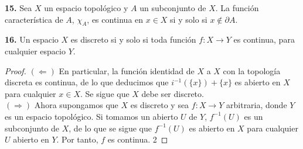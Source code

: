 \documentclass{article}
\begin{document}
\begin{mybox}
	\textbf{15. } Sea $X$ un espacio topológico y $A$ un subconjunto de $X$. La función característica de $A$, $\chi_{A}$, es continua en $x \in X$ si y solo si $x \notin \partial A$. 
\end{mybox}

\begin{mybox}
	\textbf{16. } Un espacio $X$ es discreto si y solo si toda función $f:X \rightarrow Y$ es continua, para cualquier espacio $Y$.
\end{mybox}	

\begin{proof}
	$(\Leftarrow)$ En particular, la función identidad de $X$ a $X$ con la topología discreta es continua, de lo que deducimos que $i^{-1}(\{x \}) + \{x \}$ es abierto en $X$ para cualquier $x \in X$. Se sigue que $X$ debe ser discreto. \\
	$(\Rightarrow)$ Ahora supongamos que $X$ es discreto y sea $f:X \rightarrow Y$ arbitraria, donde $Y$ es un espacio topológico. Si tomamos un abierto $U$ de $Y$, $f^{-1}(U)$ es un subconjunto de $X$, de lo que se sigue que $f^{-1}(U)$ es abierto en $X$ para cualquier $U$ abierto en $Y$. Por tanto, $f$ es continua. 2
\end{proof}
\end{document}
